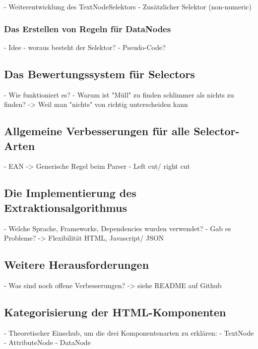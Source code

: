	- Weiterentwicklung des TextNodeSelektors
	- Zusätzlicher Selektor (non-numeric)

\subsubsection{Das Erstellen von Regeln für DataNodes}

	- Idee
	- woraus besteht der Selektor?
	- Pseudo-Code?

\subsection{Das Bewertungssystem für Selectors}

	- Wie funktioniert es?
	- Warum ist "Müll" zu finden schlimmer als nichts zu finden? -> Weil man "nichts" von richtig unterscheiden kann

\subsection{Allgemeine Verbesserungen für alle Selector-Arten}

	- EAN -> Generische Regel beim Parser
	- Left cut/ right cut
	
\subsection{Die Implementierung des Extraktionsalgorithmus}

	- Welche Sprache, Frameworks, Dependencies wurden verwendet?
	- Gab es Probleme? -> Flexibilität HTML, Javascript/ JSON
	
\subsection{Weitere Herausforderungen}
	
	- Was sind noch offene Verbesserungen? -> siehe README auf Github

\subsection{Kategorisierung der HTML-Komponenten}

	- Theoretischer Einschub, um die drei Komponentenarten zu erklären:
	- TextNode
	- AttributeNode
	- DataNode
